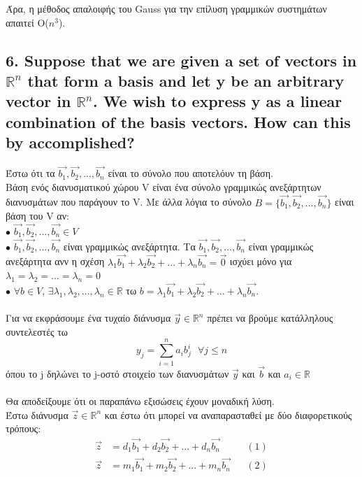 \documentclass[12pt]{article}
\newcommand{\R}{\mathbb{R}}
\begin{document}
Άρα, η μέθοδος απαλοιφής του Gauss για την επίλυση γραμμικών συστημάτων απαιτεί Ο($n^3$).

\vspace{2in}

\pagebreak

\subsection*{6. Suppose that we are given a set of vectors in $\R^n$ that form a basis and let y be an
arbitrary vector in $\R^n$. We wish to express y as a linear combination of the basis vectors. How
can this by accomplished?}

Έστω ότι τα $\vec{b_1}, \vec{b_2},...,\vec{b_n}$ είναι το σύνολο που αποτελόυν τη βάση. \\

Βάση ενός διανυσματικού χώρου V είναι ένα σύνολο γραμμικώς ανεξάρτητων διανυσμάτων που παράγουν το V. Με άλλα λόγια το σύνολο $B=\{\vec{b_1}, \vec{b_2},...,\vec{b_n}\}$ είναι βάση του V αν: \\

$\bullet$ $\vec{b_1}, \vec{b_2},...,\vec{b_n} \in V$ \\

$\bullet$ $\vec{b_1}, \vec{b_2},...,\vec{b_n}$ είναι γραμμικώς ανεξάρτητα. Tα $\vec{b_1}, \vec{b_2},...,\vec{b_n}$ είναι γραμμικώς ανεξάρτητα ανν η σχέση $λ_1\vec{b_1} + λ_2\vec{b_2} + ... + λ_n\vec{b_n} = \vec{0}$ ισχύει μόνο για $λ_1=λ_2=...=λ_n = 0$ \\

$\bullet$ $\forall b \in V$, $\exists λ_1,λ_2,...,λ_n \in \R$ τω $b = λ_1\vec{b_1} + λ_2\vec{b_2} + ... + λ_n\vec{b_n}$. \\ \\

Για να εκφράσουμε ένα τυχαίο διάνυσμα $\vec{y}\in \R^n$ πρέπει να βρούμε κατάλληλους συντελεστές τω
$$ y_j = \sum_{i=1}^{n}{a_ib_j^i} \mbox{     } \forall j \leq n $$ όπου το j δηλώνει το j-οστό στοιχείο των διανυσμάτων $\vec{y}$ και $\vec{b}$ και $a_i \in \R$ \\ \\

Θα αποδείξουμε ότι οι παραπάνω εξισώσεις έχουν μοναδική λύση. \\

Έστω διάνυσμα $\vec{z} \in \R^n$ και έστω ότι μπορεί να αναπαρασταθεί με δύο διαφορετικούς τρόπους: \\

\begin{align*}
    \vec{z} & = d_1\vec{b_1} + d_2\vec{b_2} + ... + d_n\vec{b_n} && (1) \\
    \vec{z} & = m_1\vec{b_1} + m_2\vec{b_2} + ... + m_n\vec{b_n} && (2)
\end{align*}
\end{document}
